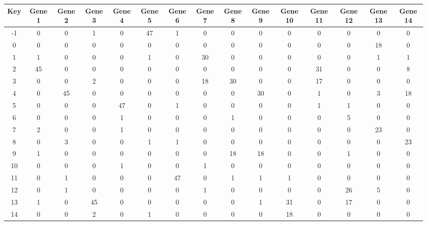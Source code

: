 \begin{tabular}{|c|c|c|c|c|c|c|c|c|c|c|c|c|c|c|}
\hline
Key & Gene 1 & Gene 2 & Gene 3 & Gene 4 & Gene 5 & Gene 6 & Gene 7 & Gene 8 & Gene 9 & Gene 10 & Gene 11 & Gene 12 & Gene 13 & Gene 14 \\
\hline
-1 & 0 & 0 & 1 & 0 & 47 & 1 & 0 & 0 & 0 & 0 & 0 & 0 & 0 & 0 \\
0 & 0 & 0 & 0 & 0 & 0 & 0 & 0 & 0 & 0 & 0 & 0 & 0 & 18 & 0 \\
1 & 1 & 0 & 0 & 0 & 1 & 0 & 30 & 0 & 0 & 0 & 0 & 0 & 1 & 1 \\
2 & 45 & 0 & 0 & 0 & 0 & 0 & 0 & 0 & 0 & 0 & 31 & 0 & 0 & 8 \\
3 & 0 & 0 & 2 & 0 & 0 & 0 & 18 & 30 & 0 & 0 & 17 & 0 & 0 & 0 \\
4 & 0 & 45 & 0 & 0 & 0 & 0 & 0 & 0 & 30 & 0 & 1 & 0 & 3 & 18 \\
5 & 0 & 0 & 0 & 47 & 0 & 1 & 0 & 0 & 0 & 0 & 1 & 1 & 0 & 0 \\
6 & 0 & 0 & 0 & 1 & 0 & 0 & 0 & 1 & 0 & 0 & 0 & 5 & 0 & 0 \\
7 & 2 & 0 & 0 & 1 & 0 & 0 & 0 & 0 & 0 & 0 & 0 & 0 & 23 & 0 \\
8 & 0 & 3 & 0 & 0 & 1 & 1 & 0 & 0 & 0 & 0 & 0 & 0 & 0 & 23 \\
9 & 1 & 0 & 0 & 0 & 0 & 0 & 0 & 18 & 18 & 0 & 0 & 1 & 0 & 0 \\
10 & 0 & 0 & 0 & 1 & 0 & 0 & 1 & 0 & 0 & 0 & 0 & 0 & 0 & 0 \\
11 & 0 & 1 & 0 & 0 & 0 & 47 & 0 & 1 & 1 & 1 & 0 & 0 & 0 & 0 \\
12 & 0 & 1 & 0 & 0 & 0 & 0 & 1 & 0 & 0 & 0 & 0 & 26 & 5 & 0 \\
13 & 1 & 0 & 45 & 0 & 0 & 0 & 0 & 0 & 1 & 31 & 0 & 17 & 0 & 0 \\
14 & 0 & 0 & 2 & 0 & 1 & 0 & 0 & 0 & 0 & 18 & 0 & 0 & 0 & 0 \\
\hline
\end{tabular}